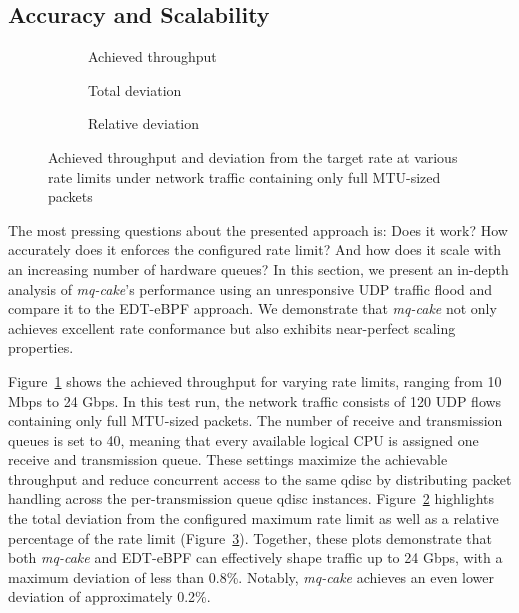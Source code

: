 \subsection{Accuracy and Scalability}
\begin{figure*}
    \begin{subfigure}{0.3\linewidth}
        \centering
        
        \caption{Achieved throughput}\label{fig:tp_rate_conformance}
    \end{subfigure}
    \hfill
    \begin{subfigure}{0.3\linewidth}
        \centering
        
        \caption{Total deviation}\label{fig:tp_deviation_total}
    \end{subfigure}
    \hfill
    \begin{subfigure}{0.3\linewidth}
        \centering
        
        \caption{Relative deviation}\label{fig:tp_deviation_perc}
    \end{subfigure}
    \caption{Achieved throughput and deviation from the target rate at various rate limits under
    network traffic containing only full MTU-sized packets}\label{fig:accuracy}
\end{figure*}
The most pressing questions about the presented approach is: Does it work? How accurately does it enforces the configured rate limit? And how does it scale with an increasing number of hardware queues?
In this section, we present an in-depth analysis of \textit{mq-cake}'s performance using an unresponsive UDP traffic flood and compare it to the EDT-eBPF approach. 
We demonstrate that \textit{mq-cake} not only achieves excellent rate conformance but also exhibits near-perfect scaling properties.

Figure~\ref{fig:tp_rate_conformance} shows the achieved throughput for varying rate limits, ranging from 10 Mbps to 24 Gbps.
%
In this test run, the network traffic consists of 120 UDP flows containing only full MTU-sized packets.
%
The number of receive and transmission queues is set to 40, meaning that every available logical CPU is assigned one receive and transmission queue.
%
These settings maximize the achievable throughput and reduce concurrent access to the same qdisc by distributing packet handling across the per-transmission queue qdisc instances.
%
Figure~\ref{fig:tp_deviation_total} highlights the total deviation from the configured maximum rate limit as well as a relative percentage of the rate limit (Figure~\ref{fig:tp_deviation_perc}).
%
Together, these plots demonstrate that both \textit{mq-cake} and EDT-eBPF can effectively shape traffic up to 24 Gbps, with a maximum deviation of less than 0.8\%. Notably, \textit{mq-cake} achieves an even lower deviation of approximately 0.2\%.

